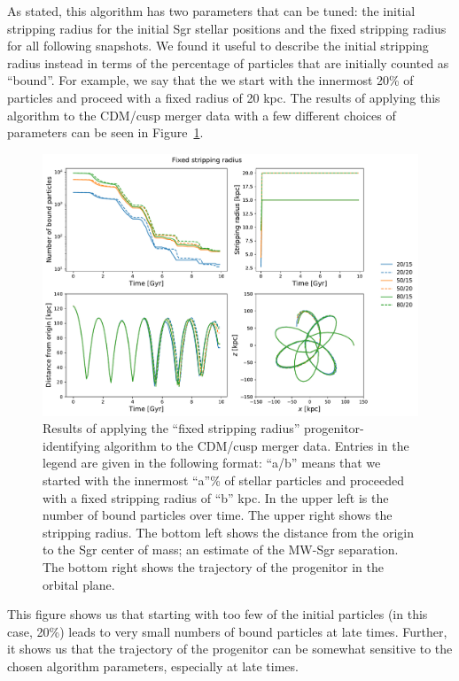 As stated, this algorithm has two parameters that can be tuned: the initial
stripping radius for the initial Sgr stellar positions and the fixed stripping
radius for all following snapshots.  We found it useful to describe the
initial stripping radius instead in terms of the percentage of particles that
are initially counted as ``bound''.  For example, we say that the we start
with the innermost 20\% of particles and proceed with a fixed radius of 20
kpc.  The results of applying this algorithm to the CDM/cusp merger data with
a few different choices of parameters can be seen in
Figure~\ref{fig:fixed_star}.

\begin{figure}
    \centering
    \includegraphics[width=0.9\linewidth]{figs/fixed_star.pdf}
    \caption{%
        Results of applying the ``fixed stripping radius''
        progenitor-identifying algorithm to the CDM/cusp merger data. Entries in
        the legend are given in the following format: ``a/b'' means that we
        started with the innermost ``a''\% of stellar particles and proceeded
        with a fixed stripping radius of ``b'' kpc.  In the upper left is the
        number of bound particles over time.  The upper right shows the
        stripping radius.  The bottom left shows the distance from the origin
        to the Sgr center of mass; an estimate of the MW-Sgr separation.  The
        bottom right shows the trajectory of the progenitor in the orbital
        plane.
    }
    \label{fig:fixed_star}
\end{figure}

This figure shows us that starting with too few of the initial particles (in
this case, 20\%) leads to very small numbers of bound particles at late times.
Further, it shows us that the trajectory of the progenitor can be somewhat
sensitive to the chosen algorithm parameters, especially at late times.

